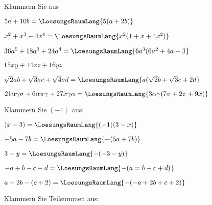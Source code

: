 
\renewcommand{\bbwAufgabenBlockID}{A1F}

\renewcommand{\metaHeaderLine}{Aufgabenblatt}
\renewcommand{\arbeitsblattTitel}{Faktorisieren}



\arbeitsblattHeader{}

Klammern Sie aus
\begin{bbwAufgabenBlock}
\item $5a+10b = \LoesungsRaumLang{5(a+2b)}$
\item $x^2+x^3-4x^4 =\LoesungsRaumLang{x^2(1+x+4x^2)}$
\item $36a^5+18a^3+24a^4 = \LoesungsRaumLang{6a^3(6a^2+4a+3}$
\item $15xy+14xz+16yz = $
\item $\sqrt{2}ab+\sqrt{3}ac + \sqrt{4}ad= \LoesungsRaumLang{a(\sqrt{2}b + \sqrt{3}c + 2d}$
\item $21\alpha\gamma\sigma + 6\alpha\pi\gamma + 27\bar{x}\gamma\alpha = \LoesungsRaumLang{3\alpha\gamma(7\sigma+2\pi+9\bar{x})}$

\end{bbwAufgabenBlock}

\platzFuerBerechnungenBisEndeSeite{}



Klammern Sie $(-1)$ aus:


\begin{bbwAufgabenBlock}
\item $(x-3) = \LoesungsRaumLang{(-1)(3-x)}$
\item $-5a-7b = \LoesungsRaumLang{-(5a+7b)}$
\item $3+y = \LoesungsRaumLang{-(-3-y)}$
\item $-a+b-c-d = \LoesungsRaumLang{-(a=b+c+d)}$
\item $a-2b-(c+2) = \LoesungsRaumLang{-(-a+2b+c+2)}$
\end{bbwAufgabenBlock}

\platzFuerBerechnungenBisEndeSeite{}



Klammern Sie Teilsummen aus:


